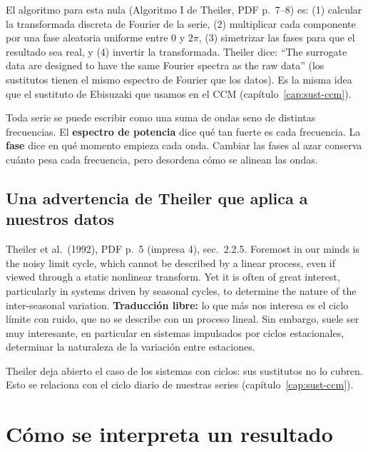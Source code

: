 \documentclass[11pt,openany]{book}
\begin{document}
El algoritmo para esta nula (Algoritmo I de Theiler, PDF p.~7--8) es: (1) calcular la transformada discreta de Fourier de la serie, (2) multiplicar cada componente por una fase aleatoria uniforme entre 0 y $2\pi$, (3) simetrizar las fases para que el resultado sea real, y (4) invertir la transformada. Theiler dice: ``The surrogate data are designed to have the same Fourier spectra as the raw data'' (los sustitutos tienen el mismo espectro de Fourier que los datos). Es la misma idea que el sustituto de Ebisuzaki que usamos en el CCM (capítulo~\ref{cap:sust-ccm}).

\begin{nota}
Toda serie se puede escribir como una suma de ondas seno de distintas frecuencias. El \textbf{espectro de potencia} dice qué tan fuerte es cada frecuencia. La \textbf{fase} dice en qué momento empieza cada onda. Cambiar las fases al azar conserva cuánto pesa cada frecuencia, pero desordena cómo se alinean las ondas.
\end{nota}

\subsection*{Una advertencia de Theiler que aplica a nuestros datos}

\begin{cita}{Theiler et al.\ (1992), PDF p.~5 (impresa 4), sec.~2.2.5.}
Foremost in our minds is the noisy limit cycle, which cannot be described by a linear process, even if viewed through a static nonlinear transform. Yet it is often of great interest, particularly in systems driven by seasonal cycles, to determine the nature of the inter-seasonal variation.
\tcblower
\textbf{Traducción libre:} lo que más nos interesa es el ciclo límite con ruido, que no se describe con un proceso lineal. Sin embargo, suele ser muy interesante, en particular en sistemas impulsados por ciclos estacionales, determinar la naturaleza de la variación entre estaciones.
\end{cita}

Theiler deja abierto el caso de los sistemas con ciclos: sus sustitutos no lo cubren. Esto se relaciona con el ciclo diario de nuestras series (capítulo~\ref{cap:sust-ccm}).

\section{Cómo se interpreta un resultado}
\end{document}
